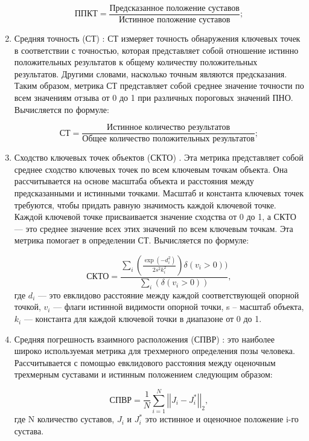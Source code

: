 \begin{enumerate}[label=\arabic*)]
	\begin{equation}
		\text{ППКТ} = \frac{\text{Предсказанное положение суставов}}{\text{Истинное положение суставов}};
	\end{equation}
	
	\item Средняя точность (СТ) \cite{guide-hpe}: СТ измеряет точность обнаружения ключевых точек в соответствии с точностью, которая представляет собой отношение истинно положительных результатов к общему количеству положительных результатов.
	Другими словами, насколько точным являются предсказания. 
	Таким образом, метрика СТ представляет собой среднее значение точности по всем значениям отзыва от 0 до 1 при различных пороговых значений ПНО.
	Вычисляется по формуле:
	
	\begin{equation}
		\text{СТ} = \frac{\text{Истинное количество результатов}}{\text{Общее количество положительных результатов}};
	\end{equation}
	
	\item Сходство ключевых точек объектов (СКТО) \cite{COCO}. Эта метрика представляет собой среднее сходство ключевых точек по всем ключевым точкам объекта.
	Она рассчитывается на основе масштаба объекта и расстояния между предсказанными и истинными точками.
	Масштаб и константа ключевых точек требуются, чтобы придать равную значимость каждой ключевой точке.
	Каждой ключевой точке присваивается значение сходства от 0 до 1, а СКТО --- это среднее значение всех этих значений по всем ключевым точкам.
	Эта метрика помогает в определении СТ.
	Вычисляется по формуле:
	
	\begin{equation}
		\text{СКТО} = \frac{\sum_i(\frac{\exp(-d_i^2)}{2s^2k_i^2})\delta(v_i>0))}{\sum_i(\delta(v_i > 0))},
	\end{equation}
	где $d_i$ --- это евклидово расстояние между каждой соответствующей опорной точкой, $v_i$ --- флаги истинной видимости опорной точки, s -- масштаб объекта, $k_i$ --- константа для каждой ключевой точки в диапазоне от 0 до 1.  
	\item Средняя погрешность взаимного расположения (СПВР) \cite{COCO}: это наиболее широко используемая метрика для трехмерного определения позы человека.
	Рассчитывается с помощью евклидового расстояния между оценочным трехмерным суставами и истинным положением следующим образом:
	
	\begin{equation}
		\text{СПВР} = \frac{1}{N}\sum_{i=1}^{N} \left| \left| J_i -J_i^*\right| \right|_2,
	\end{equation}
	где N количество суставов, $J_i$ и $J_i^*$ это истинное и оценочное положение i-го сустава.
\end{enumerate}

